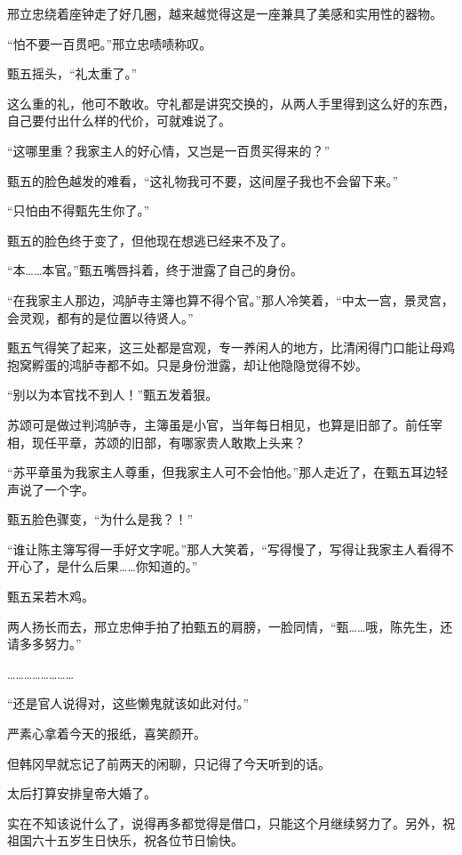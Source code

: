 邢立忠绕着座钟走了好几圈，越来越觉得这是一座兼具了美感和实用性的器物。

“怕不要一百贯吧。”邢立忠啧啧称叹。

甄五摇头，“礼太重了。”

这么重的礼，他可不敢收。守礼都是讲究交换的，从两人手里得到这么好的东西，自己要付出什么样的代价，可就难说了。

“这哪里重？我家主人的好心情，又岂是一百贯买得来的？”

甄五的脸色越发的难看，“这礼物我可不要，这间屋子我也不会留下来。”

“只怕由不得甄先生你了。”

甄五的脸色终于变了，但他现在想逃已经来不及了。

“本……本官。”甄五嘴唇抖着，终于泄露了自己的身份。

“在我家主人那边，鸿胪寺主簿也算不得个官。”那人冷笑着，“中太一宫，景灵宫，会灵观，都有的是位置以待贤人。”

甄五气得笑了起来，这三处都是宫观，专一养闲人的地方，比清闲得门口能让母鸡抱窝孵蛋的鸿胪寺都不如。只是身份泄露，却让他隐隐觉得不妙。

“别以为本官找不到人！”甄五发着狠。

苏颂可是做过判鸿胪寺，主簿虽是小官，当年每日相见，也算是旧部了。前任宰相，现任平章，苏颂的旧部，有哪家贵人敢欺上头来？

“苏平章虽为我家主人尊重，但我家主人可不会怕他。”那人走近了，在甄五耳边轻声说了一个字。

甄五脸色骤变，“为什么是我？！”

“谁让陈主簿写得一手好文字呢。”那人大笑着，“写得慢了，写得让我家主人看得不开心了，是什么后果……你知道的。”

甄五呆若木鸡。

两人扬长而去，邢立忠伸手拍了拍甄五的肩膀，一脸同情，“甄……哦，陈先生，还请多多努力。”

……………………

“还是官人说得对，这些懒鬼就该如此对付。”

严素心拿着今天的报纸，喜笑颜开。

但韩冈早就忘记了前两天的闲聊，只记得了今天听到的话。

太后打算安排皇帝大婚了。

实在不知该说什么了，说得再多都觉得是借口，只能这个月继续努力了。另外，祝祖国六十五岁生日快乐，祝各位节日愉快。
